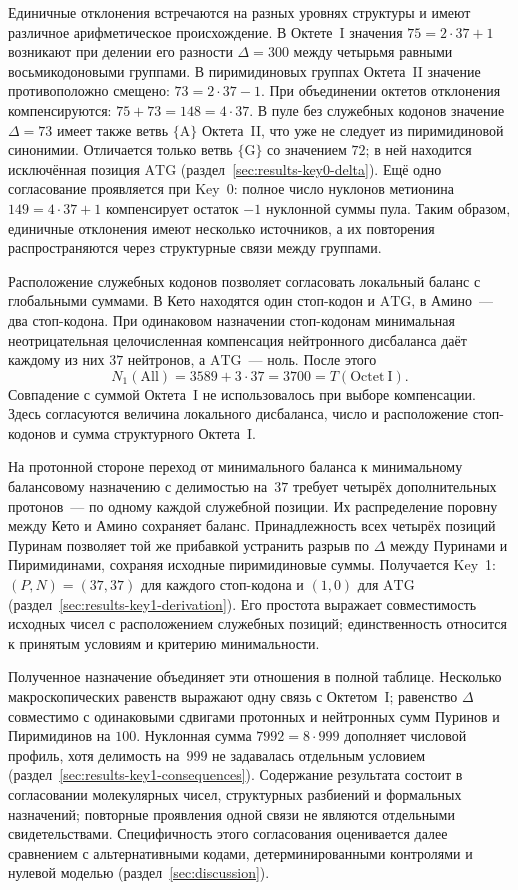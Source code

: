\documentclass[11pt,a4paper]{article}
\renewcommand{\_}{\origunderscore\allowbreak}
\begin{document}
Единичные отклонения встречаются на разных уровнях структуры и имеют различное арифметическое происхождение.
В Октете~I значения $75=2\cdot37+1$ возникают при
делении его разности $\Delta=300$ между четырьмя равными
восьмикодоновыми группами. В пиримидиновых группах
Октета~II значение противоположно смещено:
$73=2\cdot37-1$. При объединении октетов отклонения
компенсируются: $75+73=148=4\cdot37$.
В пуле без служебных кодонов значение $\Delta=73$
имеет также ветвь $\{\mathrm{A}\}$ Октета~II,
что уже не следует из пиримидиновой синонимии.
Отличается только ветвь $\{\mathrm{G}\}$ со значением
$72$; в ней находится исключённая позиция $\mathrm{ATG}$
(раздел~\ref{sec:results-key0-delta}).
Ещё одно согласование проявляется при Key~0:
полное число нуклонов метионина $149=4\cdot37+1$
компенсирует остаток $-1$ нуклонной суммы пула.
Таким образом, единичные отклонения имеют несколько
источников, а их повторения распространяются через
структурные связи между группами.

Расположение служебных кодонов позволяет согласовать
локальный баланс с глобальными суммами.
В Кето находятся один стоп-кодон и $\mathrm{ATG}$,
в Амино~--- два стоп-кодона. При одинаковом назначении
стоп-кодонам минимальная неотрицательная целочисленная
компенсация нейтронного дисбаланса даёт каждому из них
$37$ нейтронов, а $\mathrm{ATG}$~--- ноль. После этого
\[
N_1(\mathrm{All})=3589+3\cdot37
               =3700=T(\mathrm{Octet~I}).
\]
Совпадение с суммой Октета~I не использовалось при выборе
компенсации. Здесь согласуются величина локального дисбаланса,
число и расположение стоп-кодонов и сумма
структурного Октета~I.

На протонной стороне переход от минимального баланса
к минимальному балансовому назначению с делимостью
на~$37$ требует четырёх дополнительных протонов~---
по одному каждой служебной позиции.
Их распределение поровну между Кето и Амино сохраняет
баланс. Принадлежность всех четырёх позиций Пуринам
позволяет той же прибавкой устранить разрыв по $\Delta$
между Пуринами и Пиримидинами, сохраняя исходные
пиримидиновые суммы. Получается Key~1:
$(P,N)=(37,37)$ для каждого стоп-кодона и $(1,0)$
для $\mathrm{ATG}$
(раздел~\ref{sec:results-key1-derivation}).
Его простота выражает совместимость исходных чисел
с расположением служебных позиций; единственность
относится к принятым условиям и критерию минимальности.

Полученное назначение объединяет эти отношения
в полной таблице. Несколько макроскопических равенств
выражают одну связь с Октетом~I; равенство $\Delta$
совместимо с одинаковыми сдвигами протонных и нейтронных
сумм Пуринов и Пиримидинов на $100$.
Нуклонная сумма $7992=8\cdot999$ дополняет числовой
профиль, хотя делимость на~$999$ не задавалась
отдельным условием
(раздел~\ref{sec:results-key1-consequences}).
Содержание результата состоит в согласовании молекулярных
чисел, структурных разбиений и формальных назначений;
повторные проявления одной связи не являются отдельными
свидетельствами. Специфичность этого согласования
оценивается далее сравнением с альтернативными кодами,
детерминированными контролями и нулевой моделью
(раздел~\ref{sec:discussion}).
\end{document}
